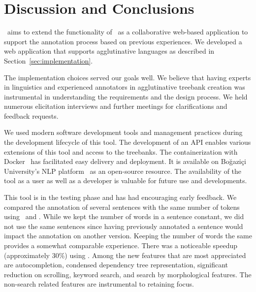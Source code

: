 \section{Discussion and Conclusions}
\label{sec:discussion}


\boatvtwo\ aims to extend the functionality of \boatvone\ as a collaborative web-based application to support the annotation process based on previous experiences.
We developed a web application that supports agglutinative languages as described in Section~\ref{sec:implementation}.

The implementation choices served our goals well.
We believe that having experts in linguistics and experienced annotators in agglutinative treebank creation was instrumental in understanding the requirements and the design process.
We held numerous elicitation interviews and further meetings for clarifications and feedback requests.

We used modern software development tools and management practices during the development lifecycle of this tool.
The development of an API enables various extensions of this tool and access to the treebanks.
The containerization with Docker~\cite{docker} has facilitated easy delivery and deployment.
It is available on Boğaziçi University's NLP platform~\cite{TULAP} as an open-source resource.
The availability of the tool as a user as well as a developer is valuable for future use and developments.

This tool is in the testing phase and has had encouraging early feedback.
We compared the annotation of several sentences with the same number of tokens using \boatvone\ and \boatvtwo.
While we kept the number of words in a sentence constant, we did not use the same sentences since having previously annotated a sentence would impact the annotation on another version.
Keeping the number of words the same provides a somewhat comparable experience.
There was a noticeable speedup (approximately 30\%) using \boatvtwo.
Among the new features that are most appreciated are autocompletion, condensed dependency tree representation, significant reduction on scrolling, keyword search, and search by morphological features.
The non-search related features are instrumental to retaining focus.

